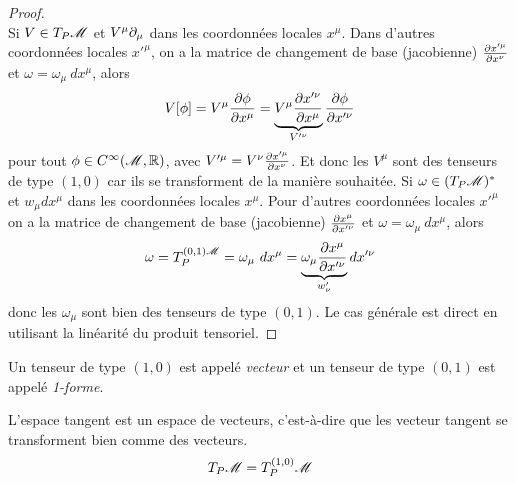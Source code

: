\documentclass[a4paper,11pt]{report}
\begin{document}
                \begin{proof}${}$\\
                    Si $V\in T_P\mathscr{M}$ et $V^\mu\partial_\mu$ dans les coordonnées locales $x^\mu$. Dans d'autres coordonnées locales $x'^\mu$, on a la matrice de changement de base (jacobienne) $ \frac{\partial x'^\mu}{\partial x^\nu}$ et $\omega = \omega_\mu~dx^\mu$, alors
                    \begin{equation}
                        V[\phi] = V^\mu \frac{\partial\phi}{\partial x^\mu} =  \underbrace{V^\mu\frac{\partial x'^\nu}{\partial x^\mu}}_{V'^\nu}\frac{\partial\phi}{\partial x'^\nu}
                    \end{equation}
                    pour tout $\phi\in C^\infty(\mathscr{M},\mathbb{R})$, avec $V'^\mu = V^\nu\frac{\partial x'^\mu}{\partial x^\nu}$. Et donc les $V^\mu$ sont des tenseurs de type $(1,0)$ car ils se transforment de la manière souhaitée. Si $\omega\in (T_P\mathscr{M})^*$ et $w_\mu dx^\mu$ dans les coordonnées locales $x^\mu$. Pour d'autres coordonnées locales $x'^\mu$ on a la matrice de changement de base (jacobienne) $ \frac{\partial x^\mu}{\partial x'^\nu}$ et $\omega = \omega_\mu~dx^\mu$, alors
                    \begin{equation}
                        \omega = T_P^{(0,1)\mathscr{M}} = \omega_\mu~dx^\mu =  \underbrace{\omega_\mu \frac{\partial x^\mu}{\partial x'^\nu}}_{w'_\nu}dx'^\nu
                    \end{equation}
                    donc les $\omega_\mu$ sont bien des tenseurs de type $(0,1)$. Le cas générale est direct en utilisant la linéarité du produit tensoriel.
                \end{proof}
                
                \begin{defn}
                    Un tenseur de type $(1,0)$ est appelé \textit{vecteur} et un tenseur de type $(0,1)$ est appelé \textit{1-forme}.
                \end{defn}
                
                \begin{prop}\begin{leftbar}
                    L'espace tangent est un espace de vecteurs, c'est-à-dire que les vecteur tangent se transforment bien comme des vecteurs.
                    \begin{equation}
                        T_P\mathscr{M} = T^{(1,0)}_P\mathscr{M}
                    \end{equation}
                \end{leftbar}\end{prop}
                
\end{document}
